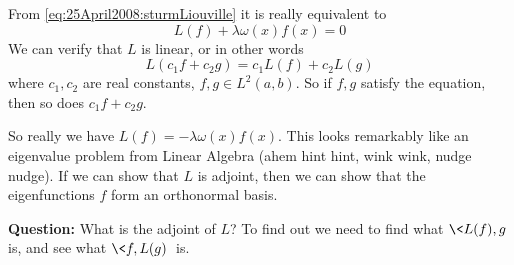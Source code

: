 \begin{rmk}
From \eqref{eq:25April2008:sturmLiouville} it is really
equivalent to
\begin{equation}
L(f) + \lambda\omega(x)f(x)=0
\end{equation}
We can verify that $L$ is linear, or in other words
\begin{equation}
L(c_1f+c_2g) = c_1L(f)+c_2L(g)
\end{equation}
where $c_1,c_2$ are real constants, $f,g\in L^{2}(a,b)$. So
if $f,g$ satisfy the equation, then so does $c_1f+c_2g$.
\end{rmk}
So really we have $L(f)=-\lambda\omega(x)f(x)$. This looks
remarkably like an eigenvalue problem from Linear Algebra
(ahem hint hint, wink wink, nudge nudge). If we can
show that $L$ is adjoint, then we can show that the
eigenfunctions $f$ form an orthonormal basis.

\textbf{Question:} What is the adjoint of $L$? To find out
we need to find what $\<L(f),g\>$ is, and see what
$\<f,L(g)\>$ is.

